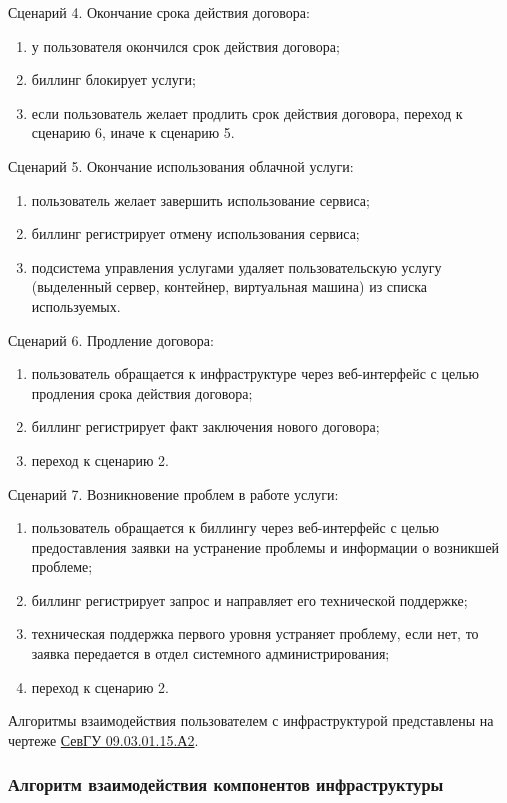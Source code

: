 Сценарий 4. Окончание срока действия договора:
\begin{enumerate}
  \item у пользователя окончился срок действия договора;
  \item биллинг блокирует услуги;
  \item если пользователь желает продлить срок действия договора, переход к сценарию 6, иначе к сценарию 5.
\end{enumerate}

Сценарий 5. Окончание использования облачной услуги:
\begin{enumerate}
  \item пользователь желает завершить использование сервиса;
  \item биллинг регистрирует отмену использования сервиса;
  \item подсистема управления услугами удаляет пользовательскую услугу (выделенный сервер, контейнер, виртуальная машина) из списка используемых.
\end{enumerate}

Сценарий 6. Продление договора:
\begin{enumerate}
  \item пользователь обращается к инфраструктуре через веб-интерфейс с целью продления срока действия договора;
  \item биллинг регистрирует факт заключения нового договора;
  \item переход к сценарию 2.
\end{enumerate}

Сценарий 7. Возникновение проблем в работе услуги:
\begin{enumerate}
  \item пользователь обращается к биллингу через веб-интерфейс с целью предоставления заявки на устранение проблемы и информации о возникшей проблеме;
  \item биллинг регистрирует запрос и направляет его технической поддержке;
  \item техническая поддержка первого уровня устраняет проблему, если нет, то заявка передается в отдел системного администрирования;
  \item переход к сценарию 2.
\end{enumerate}

Алгоритмы взаимодействия пользователем с инфраструктурой представлены на чертеже \href{extra/drafts/SevGU_09.03.01.15.A2.pdf}{СевГУ 09.03.01.15.А2}.

\subsubsection{Алгоритм взаимодействия компонентов инфраструктуры} \label{infr-comp}

